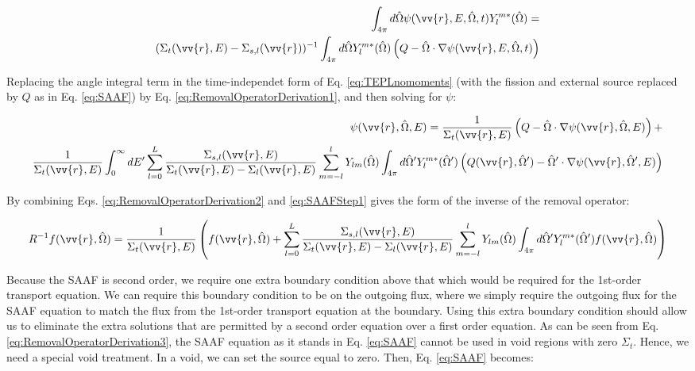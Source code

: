 \documentclass[10pt]{article}
\begin{document}
\begin{flushleft}
\begin{equation}
\label{eq:RemovalOperatorDerivation1}
\begin{aligned}
 \int_{4\pi}^{}d\hat{\Omega} \psi(\vv{r}, E, \hat{\Omega},t)Y_l^{m*}(\hat{\Omega}) = \\
 (\Sigma_t(\vv{r},E) - \Sigma_{s,l}(\vv{r}))^{-1}\int_{4\pi}^{} d\hat{\Omega}Y_l^{m*}(\hat{\Omega}) \left(Q - \hat{\Omega}\cdot\nabla\psi(\vv{r}, E, \hat{\Omega},t)\right)
\end{aligned}
\end{equation}

Replacing the angle integral term in the time-independet form of Eq. \ref{eq:TEPLnomoments} (with the fission and external source replaced by \(Q\) as in Eq. \ref{eq:SAAF}) by Eq. \ref{eq:RemovalOperatorDerivation1}, and then solving for \(\psi\):

\begin{equation}
\label{eq:RemovalOperatorDerivation2}
\begin{aligned}
\psi(\vv{r}, \hat{\Omega}, E) = \frac{1} {\Sigma_t(\vv{r}, E)} \left(Q - \hat{\Omega}\cdot\nabla\psi(\vv{r}, \hat{\Omega}, E)\right) +\\
\frac{1}{\Sigma_t(\vv{r}, E)} \int_{0}^{\infty}dE' \sum_{l=0}^{L} \frac{\Sigma_{s,l}(\vv{r}, E)}{\Sigma_t(\vv{r}, E) - \Sigma_l(\vv{r}, E)} \sum_{m=-l}^{l}  Y_{lm}(\hat{\Omega}) \int_{4\pi}^{} d\hat{\Omega}' Y_l^{m*}(\hat{\Omega}') \left(Q(\vv{r}, \hat{\Omega}') - \hat{\Omega}'\cdot\nabla\psi(\vv{r}, \hat{\Omega}', E)\right)
\end{aligned}
\end{equation}

By combining Eqs. \ref{eq:RemovalOperatorDerivation2} and \ref{eq:SAAFStep1} gives the form of the inverse of the removal operator:

\begin{equation}
\label{eq:RemovalOperatorDerivation3}
R^{-1} f(\vv{r}, \hat{\Omega}) = \frac{1}{\Sigma_t(\vv{r}, E)} \left(f(\vv{r}, \hat{\Omega}) + \sum_{l=0}^{L} \frac{\Sigma_{s,l}(\vv{r}, E)}{\Sigma_t(\vv{r}, E) - \Sigma_l(\vv{r}, E)}\sum_{m=-l}^{l}  Y_{lm}(\hat{\Omega})\int_{4\pi}^{} d\hat{\Omega}' Y_l^{m*}(\hat{\Omega}') f(\vv{r}, \hat{\Omega})\right)
\end{equation}

Because the SAAF is second order, we require one extra boundary condition above that which would be required for the 1st-order transport equation. We can require this boundary condition to be on the outgoing flux, where we simply require the outgoing flux for the SAAF equation to match the flux from the 1st-order transport equation at the boundary. Using this extra boundary condition should allow us to eliminate the extra solutions that are permitted by a second order equation over a first order equation. As can be seen from Eq. \ref{eq:RemovalOperatorDerivation3}, the SAAF equation as it stands in Eq. \ref{eq:SAAF} cannot be used in void regions with zero \(\Sigma_t\). Hence, we need a special void treatment. In a void, we can set the source equal to zero. Then, Eq. \ref{eq:SAAF} becomes:


\end{flushleft}
\end{document}
